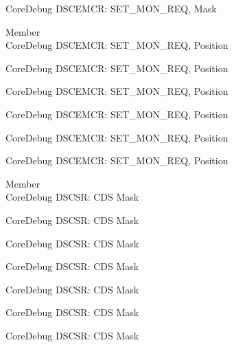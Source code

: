 \begin{DoxyRefList}
\label{deprecated__deprecated001288}%
%
Core\+Debug DSCEMCR\+: SET\+\_\+\+MON\+\_\+\+REQ, Mask  
\item[Member \doxylink{group___c_m_s_i_s___s_c_b_ga77f02a6d773fa2c6daafbbdd7df2d9d2}{Core\+Debug\+\_\+\+DSCEMCR\+\_\+\+SET\+\_\+\+MON\+\_\+\+REQ\+\_\+\+Pos} ]\hfill \\
\label{deprecated__deprecated000075}%
%
Core\+Debug DSCEMCR\+: SET\+\_\+\+MON\+\_\+\+REQ, Position 

\label{deprecated__deprecated000526}%
%
Core\+Debug DSCEMCR\+: SET\+\_\+\+MON\+\_\+\+REQ, Position 

\label{deprecated__deprecated000628}%
%
Core\+Debug DSCEMCR\+: SET\+\_\+\+MON\+\_\+\+REQ, Position 

\label{deprecated__deprecated000734}%
%
Core\+Debug DSCEMCR\+: SET\+\_\+\+MON\+\_\+\+REQ, Position 

\label{deprecated__deprecated001185}%
%
Core\+Debug DSCEMCR\+: SET\+\_\+\+MON\+\_\+\+REQ, Position 

\label{deprecated__deprecated001287}%
%
Core\+Debug DSCEMCR\+: SET\+\_\+\+MON\+\_\+\+REQ, Position  
\item[Member \doxylink{group___c_m_s_i_s___s_c_b_ga083417245e1aa40e84a2b12433a15a6b}{Core\+Debug\+\_\+\+DSCSR\+\_\+\+CDS\+\_\+\+Msk} ]\hfill \\
\label{deprecated__deprecated000094}%
%
Core\+Debug DSCSR\+: CDS Mask 

\label{deprecated__deprecated000148}%
%
Core\+Debug DSCSR\+: CDS Mask 

\label{deprecated__deprecated000224}%
%
Core\+Debug DSCSR\+: CDS Mask 

\label{deprecated__deprecated000287}%
%
Core\+Debug DSCSR\+: CDS Mask 

\label{deprecated__deprecated000366}%
%
Core\+Debug DSCSR\+: CDS Mask 

\label{deprecated__deprecated000442}%
%
Core\+Debug DSCSR\+: CDS Mask 

\label{deprecated__deprecated000545}%
%
Core\+Debug DSCSR\+: CDS Mask 


\end{DoxyRefList}
